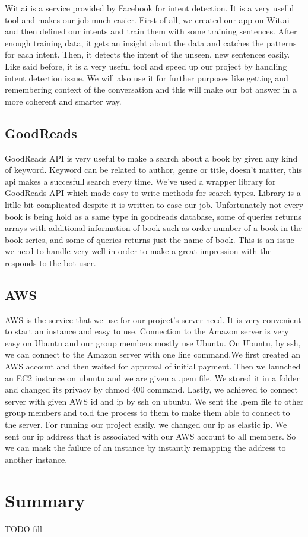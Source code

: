 \documentclass[a4paper]{article}
\begin{document}
\quad Wit.ai is a service provided by Facebook for intent detection. It is a very useful tool and makes our job much easier. First of all, we created our app on Wit.ai and then defined our intents and train them with some training sentences. After enough training data, it gets an insight about the data and catches the patterns for each intent. Then, it detects the intent of the unseen, new sentences easily. Like said before, it is a very useful tool and speed up our project by handling intent detection issue. We will also use it for further purposes like getting and remembering context of the conversation and this will make our bot answer in a more coherent and smarter way.
\subsection{GoodReads}

\quad GoodReads API is very useful to make a search about a book by given any kind of keyword. Keyword can be related to author, genre or title, doesn't matter, this api makes a succesfull search every time. We've used a wrapper library for GoodReads API which made easy to write methods for search types. Library is a litlle bit complicated despite it is written to ease our job. Unfortunately not every book is being hold as a same type in goodreads database, some of queries returns arrays with additional information of book such as order number of a book in the book series, and some of queries returns just the name of book. This is an issue we need to handle very well in order to make a great impression with the responds to the bot user.  
\subsection{AWS}

\quad AWS is the service that we use for our project's server need. It is very convenient to start an instance and easy to use. Connection to the Amazon server is very easy on Ubuntu and our group members mostly use Ubuntu. On Ubuntu, by ssh, we can connect to the Amazon server with one line command.We first created an AWS account and then waited for approval of initial payment. Then we launched an EC2 instance on ubuntu and we are given a .pem file. We stored it in a folder and changed its privacy by chmod 400 command. Lastly, we achieved to connect server with given AWS id and ip by ssh on ubuntu. We sent the .pem file to other group members and told the process to them to make them able to connect to the server. For running our project easily, we changed our ip as elastic ip. We sent our ip address that is associated with our AWS account to all members. So we can mask the failure of an instance by instantly remapping the address to another instance. 

\section{Summary}
TODO fill
\end{document}
